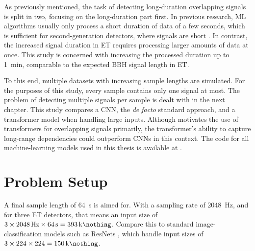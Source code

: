 
As previously mentioned, the task of detecting long-duration overlapping signals is split in two, focusing on the long-duration part first. In previous research, ML algorithms usually only process a short duration of data of a few seconds, which is sufficient for second-generation detectors, where signals are short \cite{George_2018, PhysRevD.100.063015}. In contrast, the increased signal duration in ET requires processing larger amounts of data at once. This study is concerned with increasing the processed duration up to \SI{1}{\minute}, comparable to the expected BBH signal length in ET.


To this end, multiple datasets with increasing sample lengths are simulated. For the purposes of this study, every sample contains only one signal at most. The problem of detecting multiple signals per sample is dealt with in the next chapter. This study compares a CNN, the \emph{de facto} standard approach, and a transformer model when handling large inputs. 
Although \cite{Papalini_2025} motivates the use of transformers for overlapping signals primarily, the transformer's ability to capture long-range dependencies could outperform CNNs in this context. The code for all machine-learning models used in this thesis is available at \cite{git_models}.

\section{Problem Setup}


A final sample length of \SI{64}{\second} is aimed for. With a sampling rate of \SI{2048}{\hertz}, and for three ET detectors, that means an input size of $3\times\SI{2048}{\hertz}\times\SI{64}{\second} = \SI{393}{\kilo\nothing}$. Compare this to standard image-classification models such as ResNets \cite{he2016residual}, which handle input sizes of $3\times224\times224=\SI{150}{\kilo\nothing}$.


